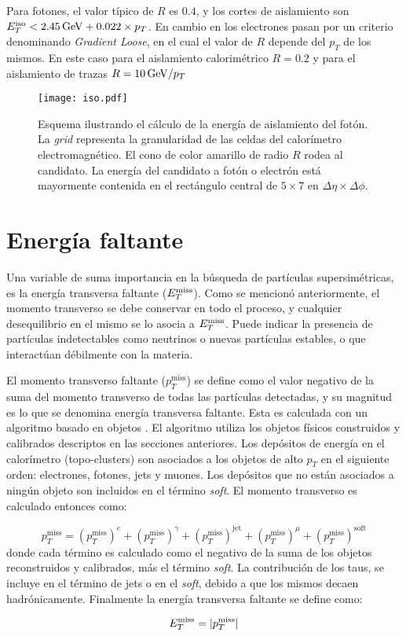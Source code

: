 Para fotones, el valor típico de $R$ es $0.4$, y los cortes de aislamiento son  $E_{T}^{\text{iso}}<2.45 \, \mathrm{GeV} + 0.022 \times p_{T}$. En cambio en los electrones pasan por un criterio denominando \textit{Gradient Loose}, en el cual el valor de $R$ depende del $p_{T}$ de los mismos. En este caso para el aislamiento calorimétrico $R=0.2$ y para el aislamiento de trazas $R=10\, \mathrm{GeV}/p_{T}$

\begin{figure}
\centering
\texttt{[image: iso.pdf]}
\caption{Esquema ilustrando el cálculo de la energía de aislamiento del fotón. La \textit{grid} representa la granularidad de las celdas del calorímetro electromagnético. El cono de color amarillo de radio $R$ rodea al candidato. La energía del candidato a fotón o electrón está mayormente contenida en el rectángulo central de $5 \times 7$ en $\Delta\eta \times \Delta\phi$.}
\label{isolation}
\end{figure}

\section{Energía faltante}

Una variable de suma importancia en la búsqueda de partículas supersimétricas, es la energía transversa faltante ($E_{T}^{\text{miss}}$). Como se mencionó anteriormente, el momento transverso se debe conservar en todo el proceso, y cualquier desequilibrio en el mismo se lo asocia a $E_{T}^{\text{miss}}$. Puede indicar la presencia de partículas indetectables como neutrinos o nuevas partículas estables, o que interactúan débilmente con la materia.

El momento transverso faltante ($p_{T}^{\text{miss}}$) se define como el valor negativo de la suma del momento transverso de todas las partículas detectadas, y su magnitud es lo que se denomina energía transversa faltante. Esta es calculada con un algoritmo basado en objetos \cite{Khoo:2012749}. El algoritmo utiliza los objetos físicos construidos y calibrados descriptos en las secciones anteriores. Los depósitos de energía en el calorímetro (topo-clusters) son asociados a los objetos de alto $p_{T}$ en el siguiente orden: electrones, fotones, jets y muones. Los depósitos que no están asociados a ningún objeto son incluidos en el término \textit{soft}. El momento transverso es calculado entonces como:

\begin{equation}
p_{T}^{\text{miss}}=\left(p_{T}^{\text{miss}}\right)^{e} + \left(p_{T}^{\text{miss}}\right)^{\gamma} + \left(p_{T}^{\text{miss}}\right)^{\text{jet}} +\left(p_{T}^{\text{miss}}\right)^{\mu} + \left(p_{T}^{\text{miss}}\right)^{\text{soft}}
\end{equation}
%
donde cada término es calculado como el negativo de la suma de los objetos reconstruidos y calibrados, más el término \textit{soft}. La contribución de los taus, se incluye en el término de jets o en el \textit{soft}, debido a que los mismos decaen hadrónicamente. Finalmente la energía transversa faltante se define como:

\begin{equation}
E_{T}^{\text{miss}}=|p_{T}^{\text{miss}}|
\end{equation}

